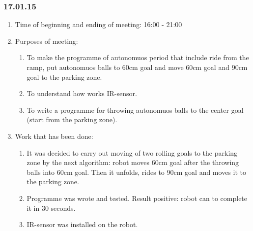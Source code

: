 \subsubsection{17.01.15}
\begin{enumerate}
	\item Time of beginning and ending of meeting: 16:00 - 21:00
	
	\item Purposes of meeting: 
	\begin{enumerate}
		\item To make the programme of autonomuos period that include ride from the ramp, put autonomuos balls to 60cm goal and move 60cm goal and 90cm goal to the parking zone.
		
		\item To understand how works IR-sensor.
		
		\item To write a programme for throwing autonomuos balls to the center goal (start from the parking zone).
	
	\end{enumerate}
	\item Work that has been done:
	\begin{enumerate}
		\item It was decided to carry out moving of two rolling goals to the parking zone by the next algorithm: robot moves 60cm goal after the throwing balls into 60cm goal. Then it unfolds, rides to 90cm goal and moves it to the parking zone.
		
		\item Programme was wrote and tested. Result positive: robot can to complete it in 30 seconds.
		
		\item  IR-sensor was installed on the robot.

		\begin{figure}[H]
			\begin{minipage}[h]{0.2\linewidth}
				\center  
			\end{minipage}
			\begin{minipage}[h]{0.6\linewidth}
				

\end{minipage}
\end{figure}
\end{enumerate}
\end{enumerate}
